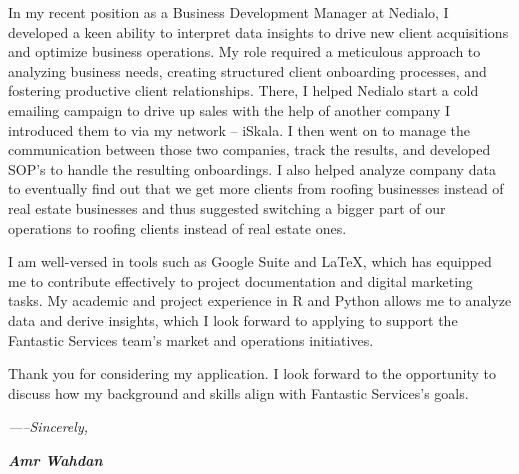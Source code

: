 \documentclass[12pt]{article}
\newcommand{\fancy}[1]{\Large\textbf{\textit{#1}}}
\begin{document}
\vspace{1em}
In my recent position as a Business Development Manager at Nedialo, I developed a keen ability to interpret data insights to drive new client acquisitions and optimize business operations. My role required a meticulous approach to analyzing business needs, creating structured client onboarding processes, and fostering productive client relationships. There, I helped Nedialo start a cold emailing campaign to drive up sales with the help of another company I introduced them to via my network -- iSkala. I then went on to manage the communication between those two companies, track the results, and developed SOP's to handle the resulting onboardings. I also helped analyze company data to eventually find out that we get more clients from roofing businesses instead of real estate businesses and thus suggested switching a bigger part of our operations to roofing clients instead of real estate ones.

\vspace{1em}
I am well-versed in tools such as Google Suite and LaTeX, which has equipped me to contribute effectively to project documentation and digital marketing tasks. My academic and project experience in R and Python allows me to analyze data and derive insights, which I look forward to applying to support the Fantastic Services team’s market and operations initiatives. \par

\vspace{1em}
Thank you for considering my application. I look forward to the opportunity to discuss how my background and skills align with Fantastic Services's goals.


\vspace{1.5em}

\textit{-----Sincerely,}

\vspace{1em}

\fancy{Amr Wahdan}
\end{document}

